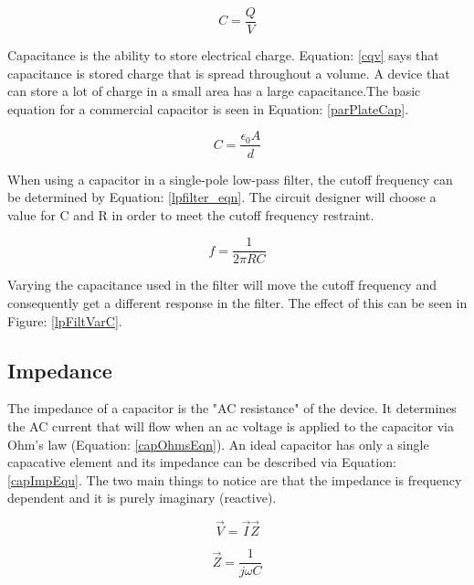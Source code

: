 \begin{equation}
\label{cqv}
C=\frac{Q}{V}
\end{equation}

Capacitance is the ability to store electrical charge. Equation: \eqref{cqv} says that capacitance is stored charge that is spread throughout a volume. A device that can store a lot of charge in a small area has a large capacitance.The basic equation for a commercial capacitor is seen in Equation: \eqref{parPlateCap}.

\begin{equation}
\label{parPlateCap}
C = \frac{\epsilon _0 A}{d}
\end{equation}

When using a capacitor in a single-pole low-pass filter, the cutoff frequency can be determined by Equation: \eqref{lpfilter_eqn}. The circuit designer will choose a value for C and R in order to meet the cutoff frequency restraint.

\begin{equation}
\label{lpfilter_eqn}
f = \frac{1}{2\pi RC}
\end{equation}

Varying the capacitance used in the filter will move the cutoff frequency and consequently get a different response in the filter. The effect of this can be seen in Figure: \ref{lpFiltVarC}.




\subsection{Impedance}

The impedance of a capacitor is the "AC resistance" of the device. It determines the AC current that will flow when an ac voltage is applied to the capacitor via Ohm's law (Equation: \eqref{capOhmsEqn}). An ideal capacitor has only a single capacative element and its impedance can be described via Equation: \eqref{capImpEqu}. The two main things to notice are that the impedance is frequency dependent and it is purely imaginary (reactive).

\begin{equation}
\label{capOhmsEqn}
\vec{V} = \vec{I} \vec{Z}
\end{equation}

\begin{equation}
\label{capImpEqu}
\vec{Z} = \frac{1}{j\omega C}
\end{equation}

